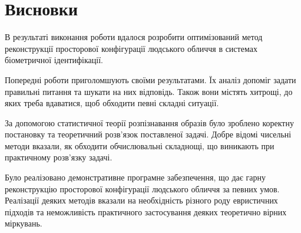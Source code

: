 \chapter*{Висновки}

В результаті виконання роботи вдалося
розробити оптимізований метод реконструкції просторової конфігурації
людського обличчя в системах біометричної ідентифікації.

Попередні роботи приголомшують своїми результатами.
Їх аналіз допоміг задати правильні питання та шукати на них відповідь.
Також вони містять хитрощі, до яких треба вдаватися,
щоб обходити певні складні ситуації.

За допомогою статистичної теорії розпізнавання образів
було зроблено коректну постановку та теоретичний розв'язок поставленої задачі.
Добре відомі чисельні методи вказали,
як обходити обчислювальні складнощі,
що виникають при практичному розв'язку задачі.

Було реалізовано демонстративне програмне забезпечення,
що дає гарну реконструкцію просторової конфігурації
людського обличчя за певних умов.
Реалізації деяких методів вказали на необхідність
різного роду евристичних підходів
та неможливість практичного застосування деяких теоретично вірних міркувань.
